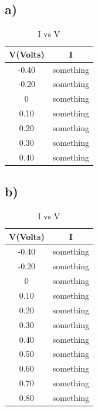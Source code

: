 \documentclass[letterpaper,12pt]{article}
\begin{document}
\subsection{a)}

\begin{table}[H]
\begin{center}
\caption{ I vs V}
\vspace{2mm}
\begin{tabular}{||c | c ||} 
\hline
V(Volts) & I \\ [0.5ex] 
\hline\hline
-0.40 & something  \\ 
\hline
-0.20 & something  \\ 
\hline
0 & something  \\ 
\hline
0.10 & something  \\ 
\hline
0.20 & something  \\ 
\hline
0.30 & something  \\ 
\hline
0.40 & something  \\ 
\hline
\end{tabular}
\end{center}
\end{table}

    
    
\subsection{b)}

\begin{table}[H]
\begin{center}
\caption{ I vs V}
\vspace{2mm}
\begin{tabular}{||c | c ||} 
\hline
V(Volts) & I \\ [0.5ex] 
\hline\hline
-0.40 & something  \\ 
\hline
-0.20 & something  \\ 
\hline
0 & something  \\ 
\hline
0.10 & something  \\ 
\hline
0.20 & something  \\ 
\hline
0.30 & something  \\ 
\hline
0.40 & something  \\ 
\hline
0.50 & something  \\ 
\hline
0.60 & something  \\ 
\hline
0.70 & something  \\ 
\hline
0.80 & something  \\ 
\hline
\end{tabular}
\end{center}
\end{table}
\end{document}
